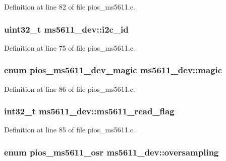 \-Definition at line 82 of file pios\-\_\-ms5611.\-c.

\hypertarget{structms5611__dev_a6a0abf07d8e11d823c152aed1a7cbf76}{
\subsubsection[{i2c\-\_\-id}]{\setlength{\rightskip}{0pt plus 5cm}uint32\-\_\-t {\bf ms5611\-\_\-dev\-::i2c\-\_\-id}}}\label{structms5611__dev_a6a0abf07d8e11d823c152aed1a7cbf76}


\-Definition at line 75 of file pios\-\_\-ms5611.\-c.

\hypertarget{structms5611__dev_af378d71dd80bc5c444c6a3516036664f}{
\subsubsection[{magic}]{\setlength{\rightskip}{0pt plus 5cm}enum {\bf pios\-\_\-ms5611\-\_\-dev\-\_\-magic} {\bf ms5611\-\_\-dev\-::magic}}}\label{structms5611__dev_af378d71dd80bc5c444c6a3516036664f}


\-Definition at line 86 of file pios\-\_\-ms5611.\-c.

\hypertarget{structms5611__dev_a207a039805c1ce6f2751655e7d5f7301}{
\subsubsection[{ms5611\-\_\-read\-\_\-flag}]{\setlength{\rightskip}{0pt plus 5cm}int32\-\_\-t {\bf ms5611\-\_\-dev\-::ms5611\-\_\-read\-\_\-flag}}}\label{structms5611__dev_a207a039805c1ce6f2751655e7d5f7301}


\-Definition at line 85 of file pios\-\_\-ms5611.\-c.

\hypertarget{structms5611__dev_a0283041db42336e9ebe601eba710bdb3}{
\subsubsection[{oversampling}]{\setlength{\rightskip}{0pt plus 5cm}enum {\bf pios\-\_\-ms5611\-\_\-osr} {\bf ms5611\-\_\-dev\-::oversampling}}}\label{structms5611__dev_a0283041db42336e9ebe601eba710bdb3}


